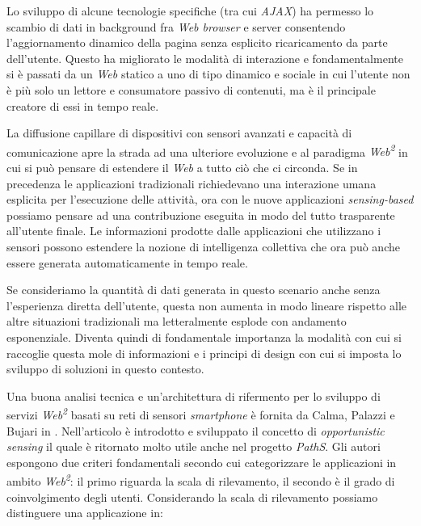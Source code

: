 Lo sviluppo di alcune tecnologie specifiche (tra cui \emph{AJAX}) ha permesso lo scambio di dati in background fra \emph{Web browser} e server consentendo l'aggiornamento dinamico della pagina senza esplicito ricaricamento da parte dell'utente. Questo ha migliorato le modalità di interazione e fondamentalmente si è passati da un \emph{Web} statico a uno di tipo dinamico e sociale in cui l'utente non è più solo un lettore e consumatore passivo di contenuti, ma è il principale creatore di essi in tempo reale.

La diffusione capillare di dispositivi con sensori avanzati e capacità di comunicazione apre la strada ad una ulteriore evoluzione e al paradigma \emph{Web\textsuperscript{2}} in cui si può pensare di estendere il \emph{Web} a tutto ciò che ci circonda. Se in precedenza le applicazioni tradizionali richiedevano una interazione umana esplicita per l'esecuzione delle attività, ora con le nuove applicazioni \emph{sensing-based} possiamo pensare ad una contribuzione eseguita in modo del tutto trasparente all'utente finale. Le informazioni prodotte dalle applicazioni che utilizzano i sensori possono estendere la nozione di intelligenza collettiva che ora può anche essere generata automaticamente in tempo reale.

Se consideriamo la quantità di dati generata in questo scenario anche senza l'esperienza diretta dell'utente, questa non aumenta in modo lineare rispetto alle altre situazioni tradizionali ma letteralmente esplode con andamento esponenziale. Diventa quindi di fondamentale importanza la modalità con cui si raccoglie questa mole di informazioni e i principi di design con cui si imposta lo sviluppo di soluzioni in questo contesto.

Una buona analisi tecnica e un'architettura di rifermento per lo sviluppo di servizi \emph{Web\textsuperscript{2}} basati su reti di sensori \emph{smartphone} è fornita da Calma, Palazzi e Bujari in \cite{web2palazzi}. Nell'articolo è introdotto e sviluppato il concetto di \emph{opportunistic sensing} il quale è ritornato molto utile anche nel progetto \emph{PathS}. Gli autori espongono due criteri fondamentali secondo cui categorizzare le applicazioni in ambito \emph{Web\textsuperscript{2}}: il primo riguarda la scala di rilevamento, il secondo è il grado di coinvolgimento degli utenti. Considerando la scala di rilevamento possiamo distinguere una applicazione in:

